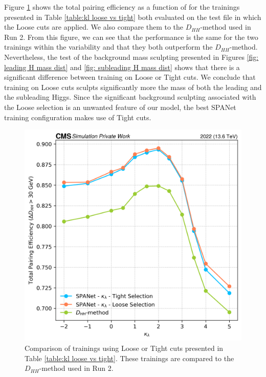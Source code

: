 Figure \ref{fig: loose vd tight} shows the total pairing efficiency as a function of \kl for the trainings presented in Table \ref{table:kl loose vs tight} both evaluated on the test file in which the Loose cuts are applied. We also compare them to the $D_{HH}$-method used in Run 2. From this figure, we can see that the performance is the same for the two trainings within the variability and that they both outperform the $D_{HH}$-method. Nevertheless, the test of the background mass sculpting presented in Figures \ref{fig: leading H mass dist} and \ref{fig: subleading H mass dist} shows that there is a significant difference between training on Loose or Tight cuts. We conclude that training on Loose cuts sculpts significantly more the mass of both the leading and the subleading Higgs. Since the significant background sculpting associated with the Loose selection is an unwanted feature of our model, the best SPANet training configuration makes use of Tight cuts.

\begin{figure}[hbt]
    \centering
    \includegraphics[width=0.6\linewidth]{Images/6.Improving/kappa lambda/loose vs tight.png}
    \caption{Comparison of trainings using Loose or Tight cuts presented in Table \ref{table:kl loose vs tight}. These trainings are compared to the $D_{HH}$-method used in Run 2.}
    \label{fig: loose vd tight}
\end{figure}

